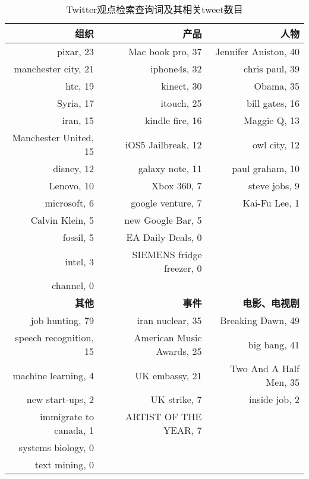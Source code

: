 \begin{table}
\centering
\caption{Twitter观点检索查询词及其相关tweet数目}
\label{OR_data}
\begin{tabular*}{\textwidth}{@{\extracolsep{\fill}}|r rr|}
  \hline
\textbf{组织}		&	\textbf{产品}		&	\textbf{人物}		\\
 \hline
pixar,	23	&	Mac book pro,	37	&	Jennifer Aniston,	40	\\
manchester city,	21	&	iphone4s,	32	&	chris paul,	39	\\
htc,	19	&	kinect,	30	&	Obama,	35	\\
Syria,	17	&	itouch,	25	&	bill gates,	16	\\
iran,	15	&	kindle fire,	16	&	Maggie Q,	13	\\
Manchester United,	15	&	iOS5 Jailbreak,	12	&	owl city,	12	\\
disney,	12	&	galaxy note,	11	&	paul graham,	10	\\
Lenovo,	10	&	Xbox 360,	7	&	steve jobs,	9	\\
microsoft,	6	&	google venture,	7	&	Kai-Fu Lee,	1	\\
Calvin Klein,	5	&	new Google Bar,	5	&			\\
fossil,	5	&	EA Daily Deals,	0	&			\\
intel,	3	&	SIEMENS fridge freezer,	0	&			\\
channel,	0	&			&			\\
 \hline								
 \hline								
\textbf{其他}		&	\textbf{事件}		&	\textbf{电影、电视剧}		\\
 \hline
job hunting,	79	&	iran nuclear,	35	&	Breaking Dawn,	49	\\
speech recognition,	15	&	American Music Awards,	25	&	big bang,	41	\\
machine learning,	4	&	UK embassy,	21	&	Two And A Half Men,	35	\\
new start-ups,	2	&	UK strike,	7	&	inside job,	2	\\
immigrate to canada,	1	&	ARTIST OF THE YEAR,	7	&			\\
systems biology,	0	&			&			\\
text mining,	0	&			&			\\
 \hline
\end{tabular*}
\end{table}

